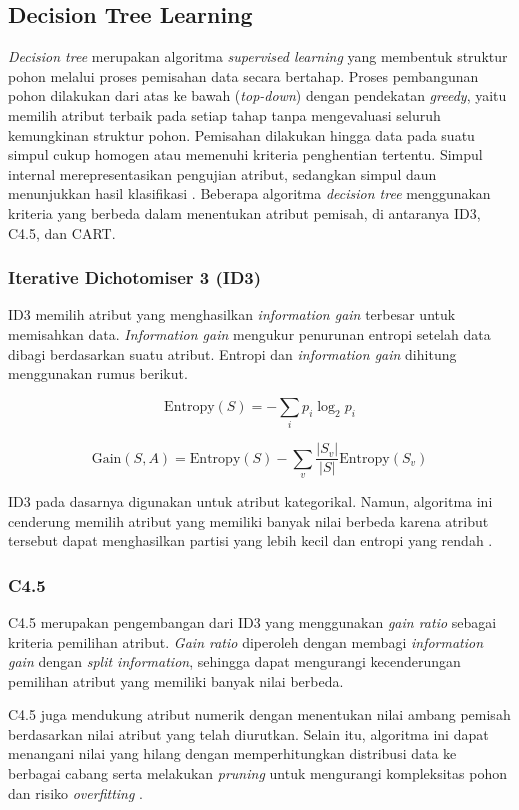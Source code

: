 \subsection{Decision Tree Learning}
\textit{Decision tree} merupakan algoritma \textit{supervised learning} yang membentuk struktur pohon melalui proses pemisahan data secara bertahap. Proses pembangunan pohon dilakukan dari atas ke bawah (\textit{top-down}) dengan pendekatan \textit{greedy}, yaitu memilih atribut terbaik pada setiap tahap tanpa mengevaluasi seluruh kemungkinan struktur pohon. Pemisahan dilakukan hingga data pada suatu simpul cukup homogen atau memenuhi kriteria penghentian tertentu. Simpul internal merepresentasikan pengujian atribut, sedangkan simpul daun menunjukkan hasil klasifikasi \cite{ref:materi-10a}. Beberapa algoritma \textit{decision tree} menggunakan kriteria yang berbeda dalam menentukan atribut pemisah, di antaranya ID3, C4.5, dan CART.

\subsubsection{Iterative Dichotomiser 3 (ID3)}
ID3 memilih atribut yang menghasilkan \textit{information gain} terbesar untuk memisahkan data. \textit{Information gain} mengukur penurunan entropi setelah data dibagi berdasarkan suatu atribut. Entropi dan \textit{information gain} dihitung menggunakan rumus berikut.

\[
\mathrm{Entropy}(S)=-\sum_i p_i\log_2 p_i
\]

\[
\mathrm{Gain}(S,A)=\mathrm{Entropy}(S)
-\sum_{v}\frac{|S_v|}{|S|}\mathrm{Entropy}(S_v)
\]

ID3 pada dasarnya digunakan untuk atribut kategorikal. Namun, algoritma ini cenderung memilih atribut yang memiliki banyak nilai berbeda karena atribut tersebut dapat menghasilkan partisi yang lebih kecil dan entropi yang rendah \cite{ref:materi-10a}.

\subsubsection{C4.5}
C4.5 merupakan pengembangan dari ID3 yang menggunakan \textit{gain ratio} sebagai kriteria pemilihan atribut. \textit{Gain ratio} diperoleh dengan membagi \textit{information gain} dengan \textit{split information}, sehingga dapat mengurangi kecenderungan pemilihan atribut yang memiliki banyak nilai berbeda.

C4.5 juga mendukung atribut numerik dengan menentukan nilai ambang pemisah berdasarkan nilai atribut yang telah diurutkan. Selain itu, algoritma ini dapat menangani nilai yang hilang dengan memperhitungkan distribusi data ke berbagai cabang serta melakukan \textit{pruning} untuk mengurangi kompleksitas pohon dan risiko \textit{overfitting} \cite{ref:materi-10c, ref:quinlan-1993}.

